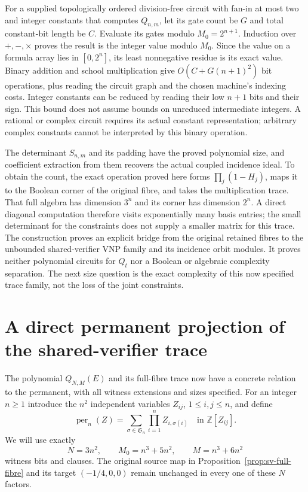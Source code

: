For a supplied topologically ordered division-free circuit with
fan-in at most two and integer constants that computes $Q_{n,m}$,
let its gate count be
$G$ and total constant-bit length be $C$. Evaluate its gates modulo
$M_0=2^{n+1}$. Induction over $+,-,\times$ proves the result is the
integer value modulo $M_0$. Since the value on a formula array lies
in $[0,2^n]$, its least nonnegative residue is its exact value.
Binary addition and school multiplication give
$O(C+G(n+1)^2)$ bit operations, plus reading the circuit graph and
the chosen machine's indexing costs. Integer constants can be reduced
by reading their low $n+1$ bits and their sign. This bound does not
assume bounds on unreduced intermediate integers. A rational or complex
circuit requires its actual constant representation; arbitrary complex
constants cannot be interpreted by this binary operation.

The determinant $S_{n,m}$ and its padding have the proved polynomial
size, and coefficient extraction from them recovers the actual coupled
incidence ideal. To obtain the count, the exact operation proved here
forms $\prod_j(1-H_j)$, maps it to the Boolean corner of the
original fibre, and takes the multiplication trace. That full algebra
has dimension $3^n$ and its corner has dimension $2^n$. A direct
diagonal computation therefore visits exponentially many basis entries;
the small determinant for the constraints does not supply a smaller
matrix for this trace. The construction proves an explicit bridge from
the original retained fibres to the unbounded shared-verifier VNP
family and its incidence orbit modules. It proves neither polynomial
circuits for $Q_t$ nor a Boolean or algebraic complexity separation.
The next size question is the exact complexity of this now specified
trace family, not the loss of the joint constraints.

\section{A direct permanent projection of the shared-verifier trace}
\label{sec:permanent-trace-projection}

The polynomial $Q_{N,M}(E)$ and its full-fibre trace now have a concrete
relation to the permanent, with all witness extensions and sizes specified.
For an integer $n\ge1$ introduce the $n^2$ independent variables
$Z_{ij}$, $1\le i,j\le n$, and define
\[
 \operatorname{per}_n(Z)=\sum_{\sigma\in\mathfrak S_n}
                  \prod_{i=1}^n Z_{i,\sigma(i)}
 \quad\text{in }\mathbb Z[Z_{ij}].
\]
We will use exactly
\begin{equation}\label{eq:per-trace-size}
 N=3n^2,\qquad M_0=n^3+5n^2,\qquad M=n^3+6n^2
\end{equation}
witness bits and clauses. The original source map in
Proposition~\ref{prop:sv-full-fibre} and its target $(-1/4,0,0)$
remain unchanged in every one of these $N$ factors.

